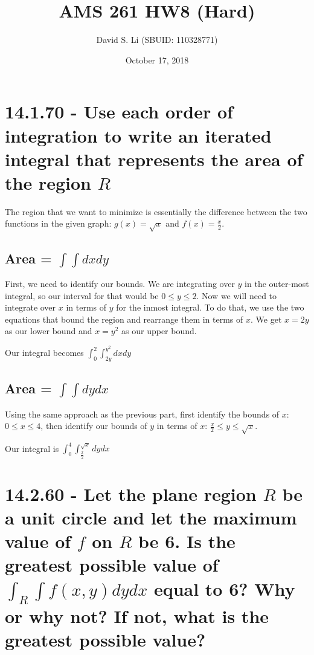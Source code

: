 \documentclass{article}
\title{AMS 261 HW8 (Hard)}
\author{David S. Li (SBUID: 110328771)}
\date{October 17, 2018}
\begin{document}
\maketitle

\section{14.1.70 - Use each order of integration to write an iterated integral that represents the area of the region $R$}
\par\noindent\large The region that we want to minimize is essentially the difference between the two functions in the given graph: $g(x) = \sqrt{x}$ and $f(x) = \frac{x}{2}$.

\subsection{Area = $\int\int dxdy$}
\par\noindent\large First, we need to identify our bounds.  We are integrating over $y$ in the outer-most integral, so our interval for that would be $0 \leq y \leq 2$.  Now we will need to integrate over $x$ in terms of $y$ for the inmost integral.  To do that, we use the two equations that bound the region and rearrange them in terms of $x$.  We get $x = 2y$ as our lower bound and $x = y^{2}$ as our upper bound.\vspace{0.25cm}

\par\noindent\Large Our integral becomes $\int_{0}^{2}\int_{2y}^{y^{2}}dxdy$
\subsection{Area = $\int\int dydx$}

\par\noindent\large Using the same approach as the previous part, first identify the bounds of $x$: $0 \leq x \leq 4$, then identify our bounds of $y$ in terms of $x$: $\frac{x}{2} \leq y \leq \sqrt{x}$.\vspace{0.25cm}

\par\noindent\Large Our integral is $\int_{0}^{4}\int_{\frac{x}{2}}^{\sqrt{x}} dydx$

\section{14.2.60 - Let the plane region $R$ be a unit circle and let the maximum value of $f$ on $R$ be 6.  Is the greatest possible value of $\int_{R}\int f(x, y) dydx$ equal to 6?  Why or why not?  If not, what is the greatest possible value?}
\end{document}
